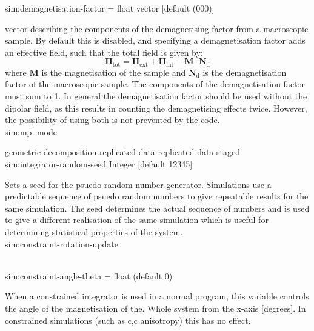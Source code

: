 {\zicf sim:demagnetisation-factor = float vector [default (000)]} vector describing the components of the demagnetising factor from a macroscopic sample. By default this is disabled, and specifying a demagnetisation factor adds an effective field, such that the total field is given by:
\begin{equation*}
\mathbf{H}_{\mathrm{tot}} = \mathbf{H}_{\mathrm{ext}} + \mathbf{H}_{\mathrm{int}} - \mathbf{M} \cdot \mathbf{N}_{\mathrm{d}}
\end{equation*}
where $\mathbf{M}$ is the magnetisation of the sample and $\mathbf{N}_{\mathrm{d}}
$ is the demagnetisation factor of the macroscopic sample. The components of the demagnetisation factor must sum to 1. In general the demagnetisation factor should be used without the dipolar field, as this results in counting the demagnetising effects twice. However, the possibility of using both is not prevented by the code.\\

{\zicf sim:mpi-mode}
    geometric-decomposition
    replicated-data
    replicated-data-staged\\
    

{\zicf sim:integrator-random-seed
    Integer [default 12345]}
    Sets a seed for the psuedo random number generator. Simulations use a predictable sequence of psuedo random numbers to give repeatable results for the same simulation. The seed determines the actual sequence of numbers and is used to give a different realisation of the same simulation which is useful for determining statistical properties of the system.\\
    
{\zicf sim:constraint-rotation-update}\\

{\zicf sim:constraint-angle-theta = float (default 0)}
    When a constrained integrator is used in a normal program, this variable controls the angle of the magnetisation of the. Whole system from the x-axis [degrees]. In constrained simulations (such as c,c anisotropy) this has no effect.\\

